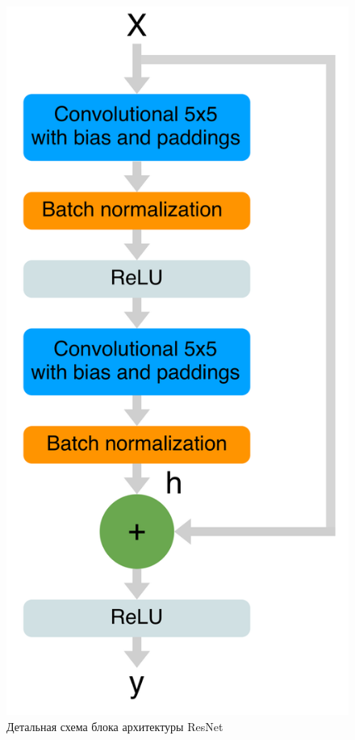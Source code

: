\documentclass[14pt]{mmcs_article}
\begin{document}
\begin{figure}[H]
	\centering
	\includegraphics[scale=0.15]{img/resnet_classic}
	\caption{Детальная схема блока архитектуры ResNet} 
	\label{fig:detail_resnet_block}
\end{figure}
\end{document}
